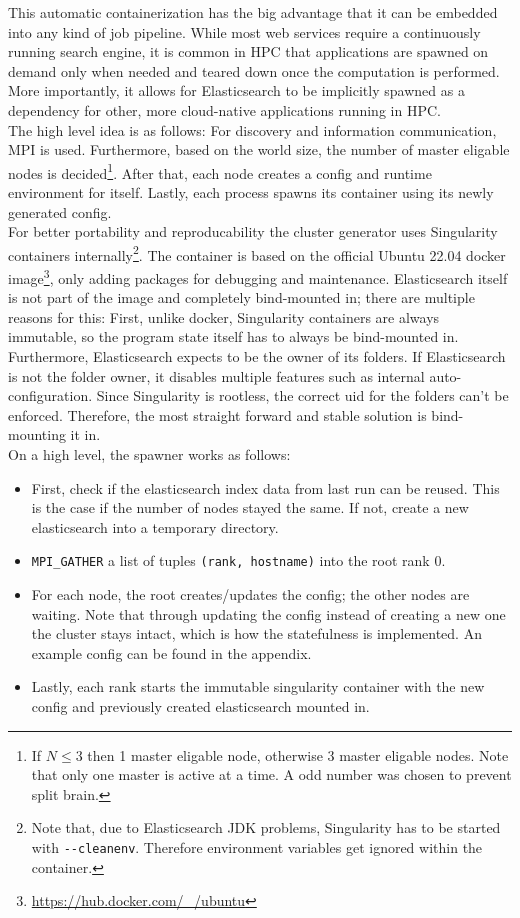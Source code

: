This automatic containerization has the big advantage that it can be embedded into any kind of job pipeline. While most web services require a continuously running search engine, it is common in \ac{HPC} that applications are spawned on demand only when needed and teared down once the computation is performed. More importantly, it allows for Elasticsearch to be implicitly spawned as a dependency for other, more cloud-native applications running in \ac{HPC}.\\

The high level idea is as follows: For discovery and information communication, \ac{MPI} is used. Furthermore, based on the world size, the number of master eligable nodes is decided\footnote{If $N \leq 3$ then 1 master eligable node, otherwise 3 master eligable nodes. Note that only one master is active at a time. A odd number was chosen to prevent split brain.}. After that, each node creates a config and runtime environment for itself. Lastly, each process spawns its container using its newly generated config.\\

For better portability and reproducability the cluster generator uses Singularity containers internally\footnote{Note that, due to Elasticsearch JDK problems, Singularity has to be started with \texttt{-{}-cleanenv}. Therefore environment variables get ignored within the container.}. The container is based on the official Ubuntu 22.04 docker image\footnote{\url{https://hub.docker.com/_/ubuntu}}, only adding packages for debugging and maintenance. Elasticsearch itself is not part of the image and completely bind-mounted in; there are multiple reasons for this: First, unlike docker, Singularity containers are always immutable, so the program state itself has to always be bind-mounted in. Furthermore, Elasticsearch expects to be the owner of its folders. If Elasticsearch is not the folder owner, it disables multiple features such as internal auto-configuration. Since Singularity is rootless, the correct uid for the folders can't be enforced. Therefore, the most straight forward and stable solution is bind-mounting it in.\\

On a high level, the spawner works as follows:
\begin{itemize}
  \item First, check if the elasticsearch index data from last run can be reused. This is the case if the number of nodes stayed the same. If not, create a new elasticsearch into a temporary directory.
  \item \texttt{MPI\_GATHER} a list of tuples \texttt{(rank, hostname)} into the root rank 0.
  \item For each node, the root creates/updates the config; the other nodes are waiting. Note that through updating the config instead of creating a new one the cluster stays intact, which is how the statefulness is implemented. An example config can be found in the appendix.
  \item Lastly, each rank starts the immutable singularity container with the new config and previously created elasticsearch mounted in.
\end{itemize}

